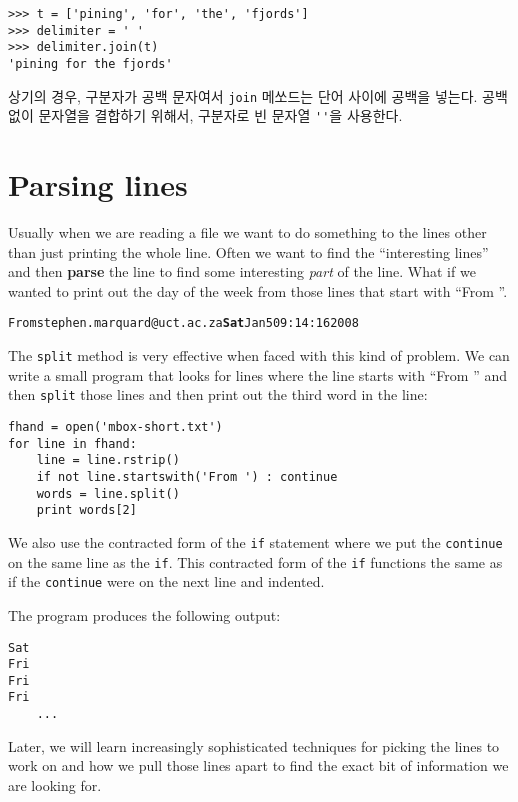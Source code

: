 \beforeverb
\begin{verbatim}
>>> t = ['pining', 'for', 'the', 'fjords']
>>> delimiter = ' '
>>> delimiter.join(t)
'pining for the fjords'
\end{verbatim}
\afterverb
%

상기의 경우, 구분자가 공백 문자여서 {\tt join} 메쏘드는 단어 사이에 공백을 넣는다.
공백없이 문자열을 결합하기 위해서, 구분자로 빈 문자열 \verb"''"을 사용한다.



\section{Parsing lines}

Usually when we are reading a file 
we want to do something to the lines other than just 
printing the whole line.  Often we want to find the ``interesting
lines'' and then {\bf parse} the line to find some interesting
\emph{part} of the line.  What if we wanted to print out the day of the 
week from those lines that start with ``From ''.

\beforeverb
\begin{alltt}
From stephen.marquard@uct.ac.za {\bf Sat} Jan  5 09:14:16 2008
\end{alltt}
\afterverb

The {\tt split} method is very effective when faced with this 
kind of problem.
We can write a small program that looks for lines where the 
line starts with ``From '' and then {\tt split} those lines 
and then print out the third word in the line:

\beforeverb
\begin{verbatim}
fhand = open('mbox-short.txt')
for line in fhand:
    line = line.rstrip()
    if not line.startswith('From ') : continue
    words = line.split()
    print words[2]
\end{verbatim}
\afterverb
%
We also use the contracted form of the {\tt if}
statement where we put the {\tt continue } on the
same line as the {\tt if}.  This contracted form
of the {\tt if} functions the same as if the
{\tt continue} were on the next line and indented.

The program produces the following output:

\beforeverb
\begin{verbatim}
Sat
Fri
Fri
Fri
    ...
\end{verbatim}
\afterverb
%
Later, we will learn increasingly sophisticated techniques for
picking the lines to work on and how we pull those lines apart
to find the exact bit of information we are looking for.

